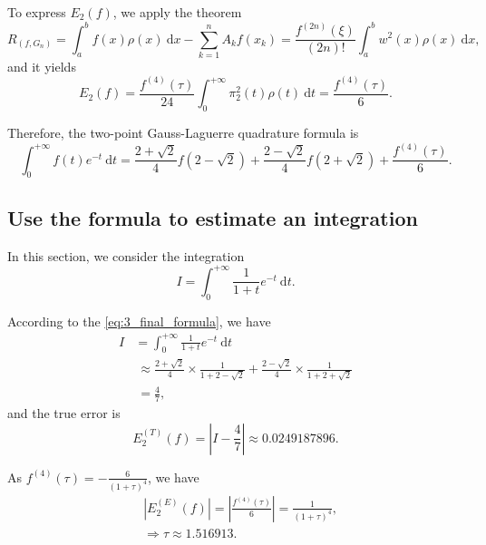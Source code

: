\documentclass[a4paper]{article}
\begin{document}
To express $E_2(f)$, we apply the theorem
\begin{equation}
    R_{(f, G_n)} = \int_a^b f(x) \rho(x)\ \mathrm{d}x - \sum_{k = 1}^n A_k f(x_k) = \frac{f^{(2n)}(\xi)}{(2n)!} \int_a^b w^2(x)\rho(x)\ \mathrm{d}x,
    \label{eq:3_theorem}
\end{equation}
and it yields
\begin{equation}
    E_2(f) = \frac{f^{(4)}(\tau)}{24} \int_0^{+\infty} \pi_2^2(t) \rho(t)\ \mathrm{d}t = \frac{f^{(4)}(\tau)}{6}.
    \label{eq:3_theorem_final}
\end{equation}

Therefore, the two-point Gauss-Laguerre quadrature formula is
\begin{equation}
    \int_0^{+\infty} f(t)e^{-t}\ \mathrm{d}t = \frac{2 + \sqrt{2}}{4} f(2 - \sqrt{2}) + \frac{2 - \sqrt{2}}{4} f(2 + \sqrt{2}) + \frac{f^{(4)}(\tau)}{6}.
    \label{eq:3_final_formula}
\end{equation}

\subsection{Use the formula to estimate an integration}

In this section, we consider the integration
\begin{equation}
    I = \int_0^{+\infty} \frac{1}{1 + t}e^{-t}\ \mathrm{d}t.
    \label{eq:3_integration}
\end{equation}

According to the \cref{eq:3_final_formula}, we have
\begin{equation}
    \begin{aligned}
        I &= \int_0^{+\infty} \frac{1}{1 + t} e^{-t} \ \mathrm{d}t \\
        &\ \approx \frac{2 + \sqrt{2}}{4} \times \frac{1}{1 + 2 - \sqrt{2}} + \frac{2 - \sqrt{2}}{4} \times \frac{1}{1 + 2 + \sqrt{2}} \\
        &\ = \frac{4}{7},
    \end{aligned}
    \label{eq:3_integration_approx}
\end{equation}
and the true error is
\begin{equation}
    E_2^{(T)}(f) = |I - \frac{4}{7}| \approx 0.0249187896.
    \label{eq:3_integration_error}
\end{equation}

As $f^{(4)}(\tau) = -\frac{6}{(1 + \tau)^4}$, we have 
\begin{equation}
    \begin{aligned}
        & |E_2^{(E)}(f)| = |\frac{f^{(4)}(\tau)}{6}| = \frac{1}{(1 + \tau)^4}, \\
        & \Rightarrow \tau \approx 1.516913.
    \end{aligned}
    \label{eq:3_integration_error_final}
\end{equation}
\end{document}
